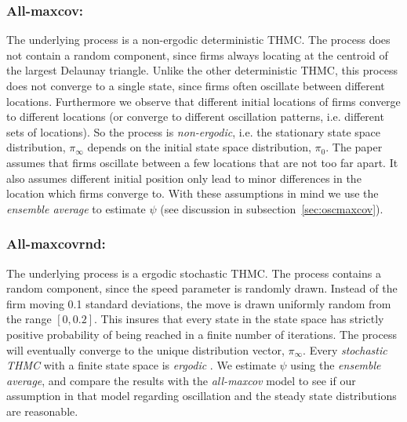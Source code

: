 \documentclass[preprint, 12pt]{elsarticle}
\begin{document}
\subsubsection*{All-maxcov:}
The underlying process is a non-ergodic deterministic THMC. The process does not contain a random component, since firms always locating at the centroid of the largest Delaunay triangle. Unlike the other deterministic THMC, this process does not converge to a single state, since firms often oscillate between different locations. Furthermore we observe that different initial locations of firms converge to different locations (or converge to different oscillation patterns, i.e. different sets of locations). So the process is \emph{non-ergodic}, i.e. the stationary state space distribution, $\pi_\infty$ depends on the initial state space distribution, $\pi_0$. The paper assumes that firms oscillate between a few locations that are not too far apart. It also assumes different initial position only lead to minor differences in the location which firms converge to. With these assumptions in mind we use the \emph{ensemble average} to estimate $\psi$ (see discussion in subsection~\ref{sec:oscmaxcov}).

\subsubsection*{All-maxcovrnd:}
The underlying process is a ergodic stochastic THMC. The process contains a random component, since the speed parameter is randomly drawn. Instead of the firm moving 0.1 standard deviations, the move is drawn uniformly random from the range $[0, 0.2]$. This insures that every state in the state space has strictly positive probability of being reached in a finite number of iterations. The process will eventually converge to the unique distribution vector, $\pi_\infty$. Every \emph{stochastic THMC} with a finite state space is \emph{ergodic} \citep[chapter~4, p.~64]{Laver_Sergenti_2011}. We estimate $\psi$ using the \emph{ensemble average}, and compare the results with the \emph{all-maxcov} model to see if our assumption in that model regarding oscillation and the steady state distributions are reasonable.
\end{document}
